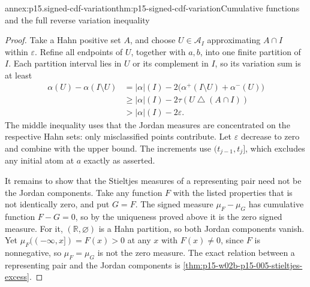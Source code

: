 \begin{annexitem}{annex:p15.signed-cdf-variation}{thm:p15-signed-cdf-variation}{Cumulative functions and the full reverse variation inequality}
\begin{proof}
Take a Hahn positive set \(A\), and choose \(U\in\mathcal A_I\)
approximating \(A\cap I\) within \(\varepsilon\).
Refine all endpoints of \(U\), together with \(a,b\), into one finite
partition of \(I\). Each partition interval lies in \(U\) or its
complement in \(I\), so its variation sum is at least
\[
 \begin{aligned}
 \alpha(U)-\alpha(I\setminus U)
   &=\lvert\alpha\rvert(I)
           -2\bigl(\alpha^+(I\setminus U)+\alpha^-(U)\bigr)\\
   &\geq\lvert\alpha\rvert(I)-2\tau(U\mathbin{\triangle}(A\cap I))\\
   &>\lvert\alpha\rvert(I)-2\varepsilon .
 \end{aligned}
\]
The middle inequality uses that the Jordan measures are concentrated
on the respective Hahn sets: only misclassified points contribute.
Let \(\varepsilon\) decrease to zero and combine with the upper bound.
The increments use \((t_{j-1},t_j]\), which excludes any initial atom
at \(a\) exactly as asserted.

It remains to show that the Stieltjes measures of a representing pair
need not be the Jordan components. Take any function \(F\) with the
listed properties that is not identically zero, and put \(G=F\).
The signed measure \(\mu_F-\mu_G\) has cumulative function \(F-G=0\),
so by the uniqueness proved above it is the zero signed measure. For it,
\((\mathbb R,\varnothing)\) is a Hahn partition, so both Jordan
components vanish. Yet \(\mu_F((-\infty,x])=F(x)>0\) at any \(x\)
with \(F(x)\neq0\), since \(F\) is nonnegative, so \(\mu_F=\mu_G\)
is not the zero measure. The exact relation between a representing pair
and the Jordan components is \cref{thm:p15-w02b-p15-005-stieltjes-excess}.
\end{proof}
\end{annexitem}

